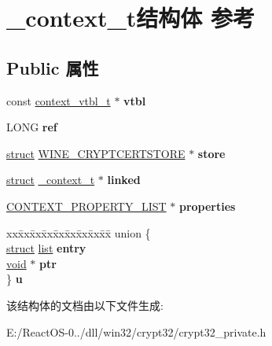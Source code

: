 \hypertarget{struct__context__t}{}\section{\+\_\+context\+\_\+t结构体 参考}
\label{struct__context__t}
\subsection*{Public 属性}
\begin{DoxyCompactItemize}
\item 
\mbox{\label{struct__context__t_a0e93387f02c54567fcd1a33b1de086e8}} 
const \hyperlink{structcontext__vtbl__t}{context\+\_\+vtbl\+\_\+t} $\ast$ {\bfseries vtbl}
\item 
\mbox{\label{struct__context__t_a343fdc81d68edebc70afb017ddbde6ad}} 
L\+O\+NG {\bfseries ref}
\item 
\mbox{\label{struct__context__t_a048ed4bfecab8abed799e920ddbcb309}} 
\hyperlink{interfacestruct}{struct} \hyperlink{struct_w_i_n_e___c_r_y_p_t_c_e_r_t_s_t_o_r_e}{W\+I\+N\+E\+\_\+\+C\+R\+Y\+P\+T\+C\+E\+R\+T\+S\+T\+O\+RE} $\ast$ {\bfseries store}
\item 
\mbox{\label{struct__context__t_ac9cfdb55ae3bbae77f591c2d2f766ea9}} 
\hyperlink{interfacestruct}{struct} \hyperlink{struct__context__t}{\+\_\+context\+\_\+t} $\ast$ {\bfseries linked}
\item 
\mbox{\label{struct__context__t_a4f18e3fbafb98ca4df5c064be9691344}} 
\hyperlink{struct___c_o_n_t_e_x_t___p_r_o_p_e_r_t_y___l_i_s_t}{C\+O\+N\+T\+E\+X\+T\+\_\+\+P\+R\+O\+P\+E\+R\+T\+Y\+\_\+\+L\+I\+ST} $\ast$ {\bfseries properties}
\item 
\mbox{\label{struct__context__t_ab07283bdf3ec557d723e702e3efa6035}} 
\begin{tabbing}
xx\=xx\=xx\=xx\=xx\=xx\=xx\=xx\=xx\=\kill
union \{\\
\>\hyperlink{interfacestruct}{struct} \hyperlink{classlist}{list} {\bfseries entry}\\
\>\hyperlink{interfacevoid}{void} $\ast$ {\bfseries ptr}\\
\} {\bfseries u}\\

\end{tabbing}\end{DoxyCompactItemize}


该结构体的文档由以下文件生成\+:\begin{DoxyCompactItemize}
\item 
E\+:/\+React\+O\+S-\/0../dll/win32/crypt32/crypt32\+\_\+private.\+h\end{DoxyCompactItemize}
